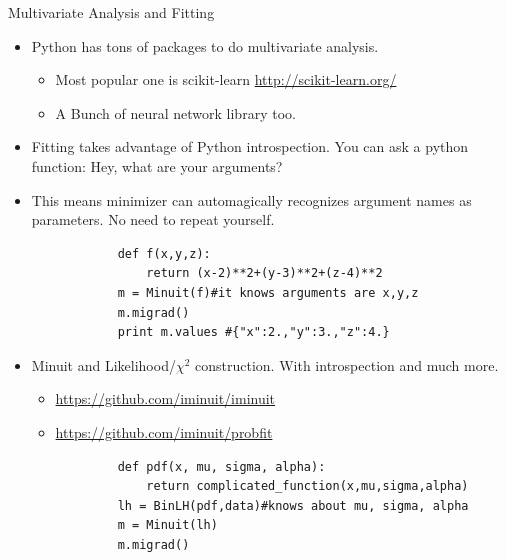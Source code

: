 \documentclass{beamer}
\begin{document}
\begin{frame}[fragile, shrink=5]{Multivariate Analysis and Fitting}
	\begin{itemize}
	\item Python has tons of packages to do multivariate analysis.
		\begin{itemize}
			\item Most popular one is scikit-learn
				\url{http://scikit-learn.org/}
			\item A Bunch of neural network library too.
		\end{itemize}
	\item Fitting takes advantage of Python introspection. You can ask a python function: Hey,
	what are your arguments? 
	\item This means minimizer can 
	automagically recognizes argument names as parameters. No need to repeat
	yourself.
		\begin{verbatim}
			def f(x,y,z):
			    return (x-2)**2+(y-3)**2+(z-4)**2
			m = Minuit(f)#it knows arguments are x,y,z
			m.migrad()
			print m.values #{"x":2.,"y":3.,"z":4.}
		\end{verbatim}
	\item Minuit and Likelihood/$\chi^2$ construction. With introspection and much more.
		\begin{itemize}
			\item \url{https://github.com/iminuit/iminuit}
			\item \url{https://github.com/iminuit/probfit}
				
		\end{itemize}
		\begin{verbatim}
			def pdf(x, mu, sigma, alpha):
			    return complicated_function(x,mu,sigma,alpha)
			lh = BinLH(pdf,data)#knows about mu, sigma, alpha
			m = Minuit(lh)
			m.migrad()
		\end{verbatim}
	\end{itemize}
\end{frame}
\end{document}
